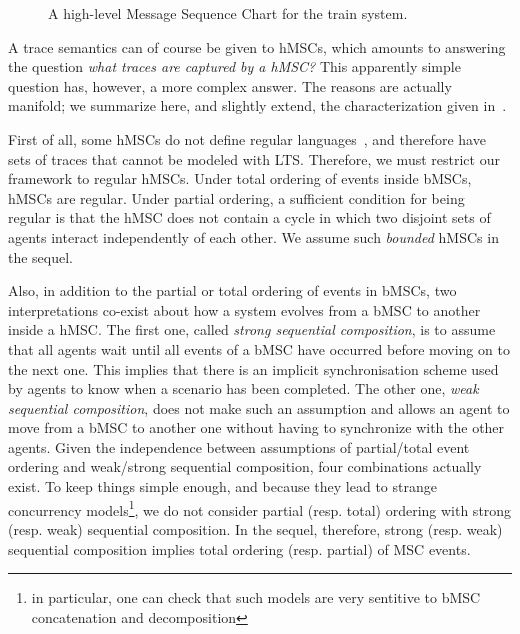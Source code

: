 \vspace{0.4cm}
\begin{figure}[H]\centering
{}
\caption{A high-level Message Sequence Chart for the train system.\label{image:train-hmsc}}
\end{figure}

A trace semantics can of course be given to hMSCs, which amounts to answering the question \emph{what traces are captured by a hMSC?} This apparently simple question has, however, a more complex answer. The reasons are actually manifold; we summarize here, and slightly extend, the characterization given in~\cite{Uchitel:2004}.

First of all, some hMSCs do not define regular languages~\cite{Henriksen:2000}, and therefore have sets of traces that cannot be modeled with LTS. Therefore, we must restrict our framework to regular hMSCs. Under total ordering of events inside bMSCs, hMSCs are regular. Under partial ordering, a sufficient condition for being regular is that the hMSC does not contain a cycle in which two disjoint sets of agents interact independently of each other. We assume such \emph{bounded} hMSCs in the sequel. 

Also, in addition to the partial or total ordering of events in bMSCs, two interpretations co-exist about how a system evolves from a bMSC to another inside a hMSC. The first one, called \emph{strong sequential composition}, is to assume that all agents wait until all events of a bMSC have occurred before moving on to the next one. This implies that there is an implicit synchronisation scheme used by agents to know when a scenario has been completed. The other one, \emph{weak sequential composition}, does not make such an assumption and allows an agent to move from a bMSC to another one without having to synchronize with the other agents. Given the independence between assumptions of partial/total event ordering and weak/strong sequential composition, four combinations actually exist. To keep things simple enough, and because they lead to strange concurrency models\footnote{in particular, one can check that such models are very sentitive to bMSC concatenation and decomposition}, we do not consider partial (resp. total) ordering with strong (resp. weak) sequential composition. In the sequel, therefore, strong (resp. weak) sequential composition implies total ordering (resp. partial) of MSC events.

